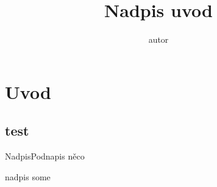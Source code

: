 \documentclass{beamer}
\title{Nadpis uvod}
\author{autor}
\begin{document}
\begin{frame}
\titlepage
\end{frame}

\section{Uvod}

\subsection{test}

	\begin{frame}{Nadpis}{Podnapis}
		něco
	
		\begin{alertblock}{nadpis}
		some
		\end{alertblock}	
	
	
	\end{frame}
\end{document}
